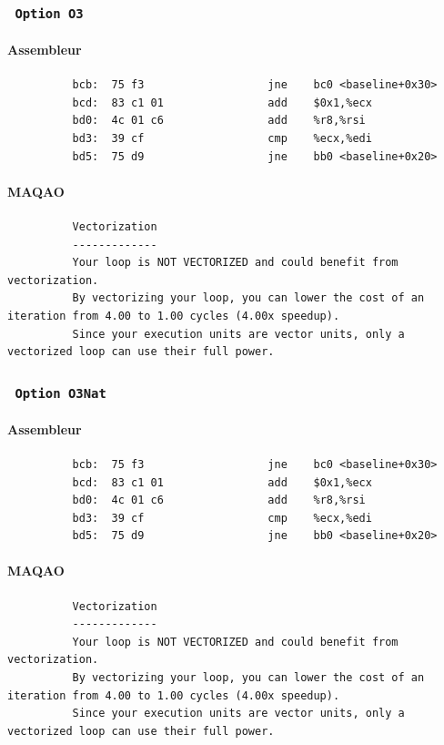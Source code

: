 \documentclass{report}
\begin{document}
      \subsubsection{ \texttt{ Option O3 }  }
      \paragraph{Assembleur}
        \begin{verbatim}
          bcb:	75 f3                	jne    bc0 <baseline+0x30>
          bcd:	83 c1 01             	add    $0x1,%ecx
          bd0:	4c 01 c6             	add    %r8,%rsi
          bd3:	39 cf                	cmp    %ecx,%edi
          bd5:	75 d9                	jne    bb0 <baseline+0x20>
        \end{verbatim}
      \paragraph{MAQAO}
        \begin{verbatim}
          Vectorization
          -------------
          Your loop is NOT VECTORIZED and could benefit from vectorization.
          By vectorizing your loop, you can lower the cost of an iteration from 4.00 to 1.00 cycles (4.00x speedup).
          Since your execution units are vector units, only a vectorized loop can use their full power.
        \end{verbatim}
      \subsubsection{ \texttt{ Option O3Nat} }
      \paragraph{Assembleur}
        \begin{verbatim}
          bcb:	75 f3                	jne    bc0 <baseline+0x30>
          bcd:	83 c1 01             	add    $0x1,%ecx
          bd0:	4c 01 c6             	add    %r8,%rsi
          bd3:	39 cf                	cmp    %ecx,%edi
          bd5:	75 d9                	jne    bb0 <baseline+0x20>
        \end{verbatim}
      \paragraph{MAQAO}
        \begin{verbatim}
          Vectorization
          -------------
          Your loop is NOT VECTORIZED and could benefit from vectorization.
          By vectorizing your loop, you can lower the cost of an iteration from 4.00 to 1.00 cycles (4.00x speedup).
          Since your execution units are vector units, only a vectorized loop can use their full power.
        \end{verbatim}
\end{document}
